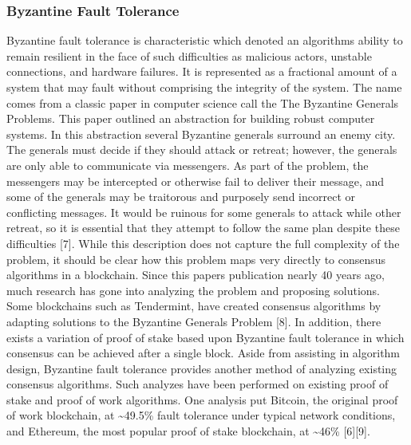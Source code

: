 \documentclass[11pt]{article}
\begin{document}
\subsubsection{Byzantine Fault Tolerance}
\label{sec:org60c3b5f}
Byzantine fault tolerance is characteristic which denoted an algorithms ability to remain resilient in the face of such difficulties as malicious actors, unstable connections, and hardware failures. It is represented as a fractional amount of a system that may fault without comprising the integrity of the system. The name comes from a classic paper in computer science call the The Byzantine Generals Problems. This paper outlined an abstraction for building robust computer systems. In this abstraction several Byzantine generals surround an enemy city. The generals must decide if they should attack or retreat; however, the generals are only able to communicate via messengers. As part of the problem, the messengers may be intercepted or otherwise fail to deliver their message, and some of the generals may be traitorous and purposely send incorrect or conflicting messages. It would be ruinous for some generals to attack while other retreat, so it is essential that they attempt to follow the same plan despite these difficulties [7]. While this description does not capture the full complexity of the problem, it should be clear how this problem maps very directly to consensus algorithms in a blockchain. Since this papers publication nearly 40 years ago, much research has gone into analyzing the problem and proposing solutions. Some blockchains such as Tendermint, have created consensus algorithms by adapting solutions to the Byzantine Generals Problem [8]. In addition, there exists a variation of proof of stake based upon Byzantine fault tolerance in which consensus can be achieved after a single block. 
Aside from assisting in algorithm design, Byzantine fault tolerance provides another method of analyzing existing consensus algorithms. Such analyzes have been performed on existing proof of stake and proof of work algorithms. One analysis put Bitcoin, the original proof of work blockchain, at \textasciitilde{}49.5\% fault tolerance under typical network conditions, and Ethereum, the most popular proof of stake blockchain, at \textasciitilde{}46\% [6][9].
\end{document}
